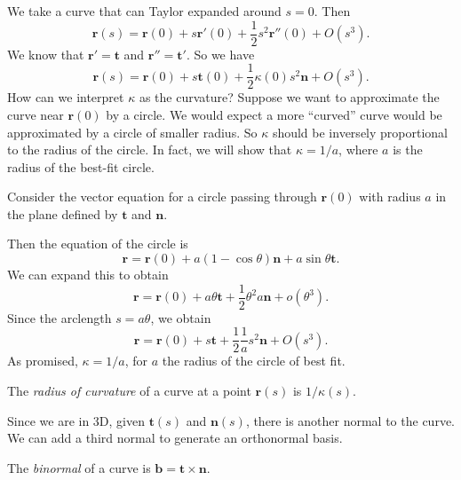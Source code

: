 \documentclass[a4paper]{article}
\begin{document}
We take a curve that can Taylor expanded around $s = 0$. Then
\[
  \mathbf{r}(s) = \mathbf{r}(0) + s\mathbf{r}'(0) + \frac{1}{2}s^2 \mathbf{r}''(0) + O(s^3).
\]
We know that $\mathbf{r}' = \mathbf{t}$ and $\mathbf{r}'' = \mathbf{t}'$. So we have
\[
  \mathbf{r}(s) = \mathbf{r}(0) + s\mathbf{t}(0) + \frac{1}{2}\kappa(0) s^2 \mathbf{n} + O(s^3).
\]
How can we interpret $\kappa$ as the curvature? Suppose we want to approximate the curve near $\mathbf{r}(0)$ by a circle. We would expect a more ``curved'' curve would be approximated by a circle of smaller radius. So $\kappa$ should be inversely proportional to the radius of the circle. In fact, we will show that $\kappa = 1/a$, where $a$ is the radius of the best-fit circle.

Consider the vector equation for a circle passing through $\mathbf{r}(0)$ with radius $a$ in the plane defined by $\mathbf{t}$ and $\mathbf{n}$.

\begin{center}
\end{center}
Then the equation of the circle is
\[
  \mathbf{r} = \mathbf{r}(0) + a(1 - \cos \theta) \mathbf{n} + a\sin \theta \mathbf{t}.
\]
We can expand this to obtain
\[
  \mathbf{r} = \mathbf{r}(0) + a\theta \mathbf{t} + \frac{1}{2}\theta^2 a\mathbf{n} + o(\theta^3).
\]
Since the arclength $s = a\theta$, we obtain
\[
  \mathbf{r} = \mathbf{r}(0) + s\mathbf{t} + \frac{1}{2}\frac{1}{a}s^2\mathbf{n} + O(s^3).
\]
As promised, $\kappa = 1/a$, for $a$ the radius of the circle of best fit.

\begin{defi}
  The \emph{radius of curvature} of a curve at a point $\mathbf{r}(s)$ is $1/\kappa(s)$.
\end{defi}
Since we are in 3D, given $\mathbf{t}(s)$ and $\mathbf{n}(s)$, there is another normal to the curve. We can add a third normal to generate an orthonormal basis.
\begin{defi}[Binormal]
  The \emph{binormal} of a curve is $\mathbf{b} = \mathbf{t}\times \mathbf{n}$.
\end{defi}
\end{document}
